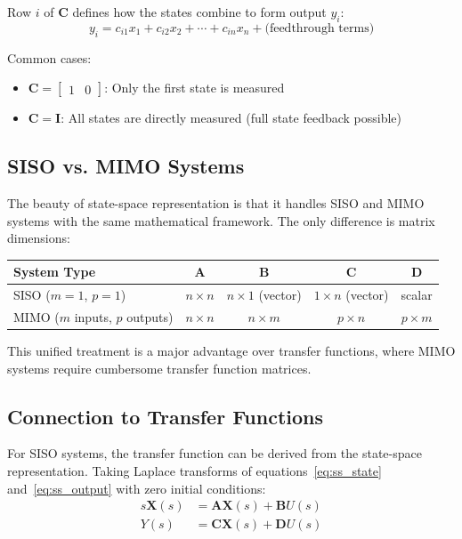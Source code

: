 Row $i$ of $\mathbf{C}$ defines how the states combine to form output $y_i$:
\begin{equation}
y_i = c_{i1}x_1 + c_{i2}x_2 + \cdots + c_{in}x_n + \text{(feedthrough terms)}
\end{equation}

Common cases:
\begin{itemize}
    \item $\mathbf{C} = \begin{bmatrix} 1 & 0 \end{bmatrix}$: Only the first state is measured
    \item $\mathbf{C} = \mathbf{I}$: All states are directly measured (full state feedback possible)
\end{itemize}

\subsection{SISO vs. MIMO Systems}

The beauty of state-space representation is that it handles SISO and MIMO systems with the same mathematical framework. The only difference is matrix dimensions:

\begin{center}
\begin{tabular}{lcccc}
\toprule
\textbf{System Type} & $\mathbf{A}$ & $\mathbf{B}$ & $\mathbf{C}$ & $\mathbf{D}$ \\
\midrule
SISO ($m=1$, $p=1$) & $n \times n$ & $n \times 1$ (vector) & $1 \times n$ (vector) & scalar \\
MIMO ($m$ inputs, $p$ outputs) & $n \times n$ & $n \times m$ & $p \times n$ & $p \times m$ \\
\bottomrule
\end{tabular}
\end{center}

This unified treatment is a major advantage over transfer functions, where MIMO systems require cumbersome transfer function matrices.

\subsection{Connection to Transfer Functions}

For SISO systems, the transfer function can be derived from the state-space representation. Taking Laplace transforms of equations~\eqref{eq:ss_state} and~\eqref{eq:ss_output} with zero initial conditions:
\begin{align}
s\mathbf{X}(s) &= \mathbf{A}\mathbf{X}(s) + \mathbf{B}U(s) \\
Y(s) &= \mathbf{C}\mathbf{X}(s) + \mathbf{D}U(s)
\end{align}

